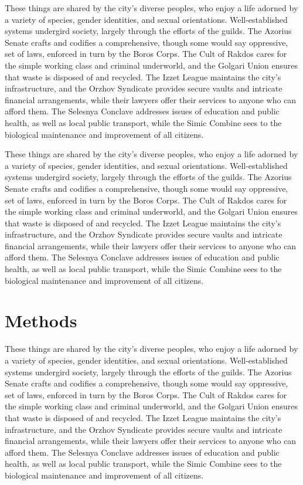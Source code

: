 These things are shared by the city's diverse peoples, who enjoy a life adorned
by a variety of  species, gender identities, and sexual orientations.
Well-established systems undergird society, largely through the efforts of the
guilds. The Azorius Senate crafts and codifies a comprehensive, though some
would say oppressive, set of laws, enforced in turn by the Boros Corps. The Cult
of Rakdos cares for the simple working class and criminal underworld, and the
Golgari Union ensures that waste is disposed of and recycled. The Izzet League
maintains the city's infrastructure, and the Orzhov Syndicate provides secure
vaults and intricate financial arrangements, while their lawyers offer their
services to anyone who can afford them. The Selesnya Conclave addresses issues
of education and public health, as well as local public transport, while the
Simic Combine sees to the biological maintenance and improvement of all
citizens.

These things are shared by the city's diverse peoples, who enjoy a life adorned
by a variety of  species, gender identities, and sexual orientations.
Well-established systems undergird society, largely through the efforts of the
guilds. The Azorius Senate crafts and codifies a comprehensive, though some
would say oppressive, set of laws, enforced in turn by the Boros Corps. The Cult
of Rakdos cares for the simple working class and criminal underworld, and the
Golgari Union ensures that waste is disposed of and recycled. The Izzet League
maintains the city's infrastructure, and the Orzhov Syndicate provides secure
vaults and intricate financial arrangements, while their lawyers offer their
services to anyone who can afford them. The Selesnya Conclave addresses issues
of education and public health, as well as local public transport, while the
Simic Combine sees to the biological maintenance and improvement of all
citizens.

\chapter*{Methods}
These things are shared by the city's diverse peoples, who enjoy a life adorned
by a variety of  species, gender identities, and sexual orientations.
Well-established systems undergird society, largely through the efforts of the
guilds. The Azorius Senate crafts and codifies a comprehensive, though some
would say oppressive, set of laws, enforced in turn by the Boros Corps. The Cult
of Rakdos cares for the simple working class and criminal underworld, and the
Golgari Union ensures that waste is disposed of and recycled. The Izzet League
maintains the city's infrastructure, and the Orzhov Syndicate provides secure
vaults and intricate financial arrangements, while their lawyers offer their
services to anyone who can afford them. The Selesnya Conclave addresses issues
of education and public health, as well as local public transport, while the
Simic Combine sees to the biological maintenance and improvement of all
citizens. 

